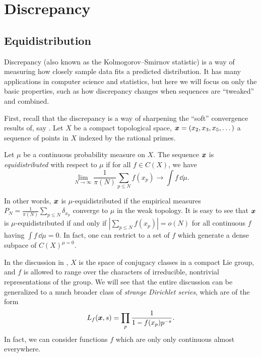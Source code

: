 
\chapter{Discrepancy}





\section{Equidistribution}

Discrepancy (also known as the Kolmogorov--Smirnov statistic) is a way of 
measuring how closely sample data fits a predicted distribution. It has many 
applications in computer science and statistics, but here we will focus on only 
the basic properties, such as how discrepancy changes when sequences 
are ``tweaked'' and combined. 

First, recall that the discrepancy is a way of sharpening the ``soft'' 
convergence results of, say \cite[A.1]{serre-1989}. Let $X$ be a compact 
topological space, ${\boldsymbol x} = (x_2,x_3,x_5,\dots)$ a sequence of points in $X$ 
indexed by the rational primes. 

\begin{definition}
Let $\mu$ be a continuous probability measure on $X$. The sequence ${\boldsymbol x}$ is 
\emph{equidistributed} with respect to $\mu$ if for all $f\in C(X)$, we have 
\[
	\lim_{N\to \infty} \frac{1}{\pi(N)} \sum_{p\leqslant N} f(x_p) \to \int f\, \dd \mu .
\]
\end{definition}

In other words, ${\boldsymbol x}$ is $\mu$-equidistributed if the empirical measures 
$P_N = \frac{1}{\pi(N)} \sum_{p\leqslant N} \delta_{x_p}$ converge to $\mu$ in 
the weak topology. It is easy to see that ${\boldsymbol x}$ is $\mu$-equidistributed if 
and only if $\left| \sum_{p\leqslant N} f(x_p)\right| = o(N)$ for all 
continuous $f$ having $\int f\, \dd\mu = 0$. In fact, one can restrict to a 
set of $f$ which generate a dense subpace of $C(X)^{\mu = 0}$. 

In the discussion in \cite[A.1]{serre-1989}, $X$ is the space of conjugacy 
classes in a compact Lie group, and $f$ is allowed to range over the characters 
of irreducible, nontrivial representations of the group. We will see that the 
entire discussion can be generalized to a much broader class of 
\emph{strange Dirichlet series}, which are of the form 
\[
	L_f({\boldsymbol x},s) = \prod_p \frac{1}{1-f(x_p)p^{-s}} .
\]
In fact, we can consider functions $f$ which are only only continuous almost 
everywhere. 

